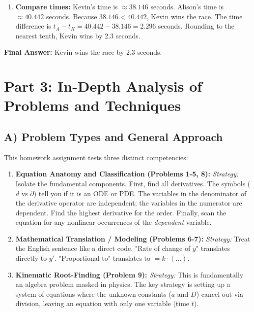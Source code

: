 \documentclass[11pt]{article}
\begin{document}
\begin{enumerate}
    Divide Eq. 4 by Eq. 3:
    \[ \frac{2}{3} = \frac{(t_K - 7)^2}{t_K^2} \implies \sqrt{\frac{2}{3}} = 1 - \frac{7}{t_K} \]
    Isolate $t_K$:
    \[ \frac{7}{t_K} = 1 - \sqrt{\frac{2}{3}} \implies t_K = \frac{7}{1 - \sqrt{2/3}} \]
    Calculating the numerical value: $\sqrt{2/3} \approx 0.81650$, so $t_K \approx \frac{7}{1 - 0.81650} \approx 38.146$ seconds.

    \item \textbf{Compare times:}
    Kevin's time is $\approx 38.146$ seconds. Alison's time is $\approx 40.442$ seconds.
    Because $38.146 < 40.442$, Kevin wins the race.
    The time difference is $t_A - t_K = 40.442 - 38.146 = 2.296$ seconds.
    Rounding to the nearest tenth, Kevin wins by $2.3$ seconds.
\end{enumerate}
\textbf{Final Answer:} Kevin wins the race by 2.3 seconds.

\section{Part 3: In-Depth Analysis of Problems and Techniques}

\subsection{A) Problem Types and General Approach}
This homework assignment tests three distinct competencies:
\begin{enumerate}
    \item \textbf{Equation Anatomy and Classification (Problems 1-5, 8):} 
    \textit{Strategy:} Isolate the fundamental components. First, find all derivatives. The symbols ($d$ vs $\partial$) tell you if it is an ODE or PDE. The variables in the denominator of the derivative operator are independent; the variables in the numerator are dependent. Find the highest derivative for the order. Finally, scan the equation for any nonlinear occurrences of the \textit{dependent} variable.
    \item \textbf{Mathematical Translation / Modeling (Problems 6-7):}
    \textit{Strategy:} Treat the English sentence like a direct code. "Rate of change of $y$" translates directly to $y'$. "Proportional to" translates to $= k \cdot (\dots)$. 
    \item \textbf{Kinematic Root-Finding (Problem 9):}
    \textit{Strategy:} This is fundamentally an algebra problem masked in physics. The key strategy is setting up a system of equations where the unknown constants ($a$ and $D$) cancel out via division, leaving an equation with only one variable (time $t$).
\end{enumerate}
\end{document}

